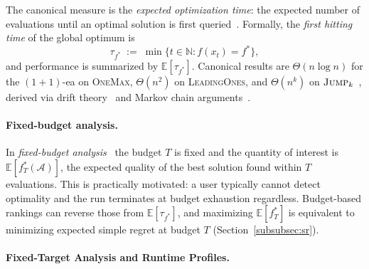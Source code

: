 The canonical measure is the \textit{expected optimization time}:
the expected number of evaluations until an optimal solution is first
queried~\cite{droste2002analysis,doerr2020theory}. Formally, the
\textit{first hitting time} of the global optimum is
\[
  \tau_{f^*} \;:=\; \min\bigl\{t \in \mathbb{N} : f(x_t) = f^*\bigr\},
\]
and performance is summarized by $\mathbb{E}[\tau_{f^*}]$. Canonical results are
$\Theta(n \log n)$ for the $(1+1)$-\acrshort{ea} on \textsc{OneMax},
$\Theta(n^2)$ on \textsc{LeadingOnes}, and $\Theta(n^k)$ on
$\textsc{Jump}_k$~\cite{droste2002analysis}, derived via drift
theory~\cite{lengler2019drift} and Markov chain
arguments~\cite{doerr2020theory}.

\paragraph{Fixed-budget analysis.}
\label{subsubsec:fixed-budget}

In \textit{fixed-budget analysis}~\cite{jansen2014fixed} the budget $T$ is fixed
and the quantity of interest is $\mathbb{E}[f^{*}_T(\mathcal{A})]$, the expected
quality of the best solution found within $T$ evaluations. This is practically
motivated: a user typically cannot detect optimality and the run terminates at
budget exhaustion regardless. Budget-based rankings can reverse those from
$\mathbb{E}[\tau_{f^*}]$, and maximizing $\mathbb{E}[f^{*}_T]$ is equivalent
to minimizing expected simple regret at budget $T$ (Section~\ref{subsubsec:sr}).

\paragraph{Fixed-Target Analysis and Runtime Profiles.}
\label{subsubsec:fixed-target}

